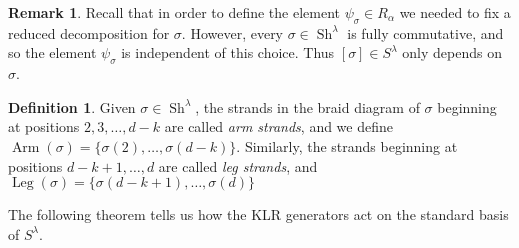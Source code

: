 \documentclass[twoside,11pt,reqno,letter]{amsart}
\numberwithin{equation}{section}
\theoremstyle{definition}  %
\newtheorem{Definition}[equation]{Definition}
\newtheorem{Remark}[equation]{Remark}
\def\bi{\text{\boldmath$i$}}
\newcommand{\Arm}{\operatorname{Arm}}
\newcommand{\Leg}{\operatorname{Leg}}
\newcommand{\Sh}{\operatorname{Sh}}
\newcommand{\0}{{\bar 0}}
\newcommand{\1}{{\bar 1}}
\newcommand{\la}{\lambda}
\newcommand{\al}{\alpha}
\newcommand{\si}{\sigma}
\def\wt{{\operatorname{wt}}}
\begin{document}
{\begin{Remark}
  Recall that in order to define the element $\psi_\si \in R_\al$ we needed to fix a reduced decomposition for $\si$. However, every $\si \in \Sh^\la$ is fully commutative, and so the element $\psi_\si$ is independent of this choice. Thus $[\si] \in S^\la$ only depends on $\si$.
\end{Remark}

\begin{Definition}
  Given $\si \in \Sh^\la$, the strands in the braid diagram of $\si$ beginning at positions $2, 3, \dots, d - k$ are called \emph{arm strands}, and we define $\Arm(\si) = \{\si(2), \dots, \si(d - k)\}$. Similarly, the strands beginning at positions $d - k + 1, \dots, d$ are called \emph{leg strands}, and $\Leg(\si) = \{\si(d - k + 1), \dots, \si(d)\}$
\end{Definition}








The following theorem tells us how the KLR generators act on the standard basis of $S^\la$.

}
\end{document}
